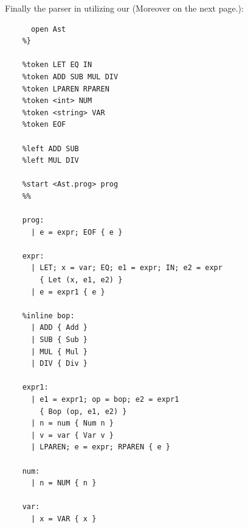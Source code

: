 \newpage 

\begin{Example}

    Finally the parser in  utilizing our  (Moreover on the next page.):
    
    \begin{lstlisting}[numbers=none]
    %{
      open Ast
    %}
    
    %token LET EQ IN
    %token ADD SUB MUL DIV
    %token LPAREN RPAREN
    %token <int> NUM
    %token <string> VAR
    %token EOF
    
    %left ADD SUB
    %left MUL DIV
    
    %start <Ast.prog> prog
    %%
    
    prog:
      | e = expr; EOF { e }
    
    expr:
      | LET; x = var; EQ; e1 = expr; IN; e2 = expr
        { Let (x, e1, e2) }
      | e = expr1 { e }
    
    %inline bop:
      | ADD { Add }
      | SUB { Sub }
      | MUL { Mul }
      | DIV { Div }
    
    expr1:
      | e1 = expr1; op = bop; e2 = expr1
        { Bop (op, e1, e2) }
      | n = num { Num n }
      | v = var { Var v }
      | LPAREN; e = expr; RPAREN { e }
    
    num:
      | n = NUM { n }
    
    var:
      | x = VAR { x }
    \end{lstlisting}

    \noindent
    
    \end{Example}
    

